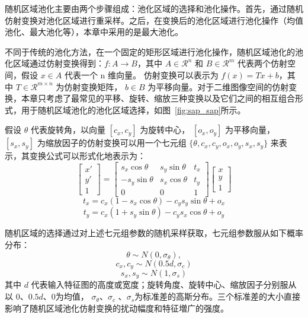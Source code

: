 随机区域池化主要由两个步骤组成：池化区域的选择和池化操作。首先，通过随机仿射变换对池化区域进行重采样。之后，在变换后的池化区域进行池化操作（均值池化、最大池化等），本章中采用的是最大池化。

不同于传统的池化方法，在一个固定的矩形区域进行池化操作，随机区域池化的池化区域通过仿射变换得到：$f : A {\rightarrow} B$，其中 $A {\in} \mathcal{R}^n$ 和 $B {\in} \mathcal{R}^m$ 代表两个仿射空间，假设 $x {\in} A$  代表一个 n 维向量。 仿射变换可以表示为 $f(x) = Tx + b$，其中 $T {\in} \mathcal{R}^{m \times n}$ 为仿射变换矩阵， $b {\in} B$ 为平移向量。对于二维图像空间的仿射变换，本章只考虑了最常见的平移、旋转、缩放三种变换以及它们之间的相互组合形式，用于随机区域池化的池化区域选择，如图~\ref{fig:sap_sap}所示。

假设 $\theta$ 代表旋转角，以向量 $[c_x, c_y]$ 为旋转中心， $[o_x, o_y]$ 为平移向量，$[s_x, s_y]$ 为缩放因子的仿射变换可以用一个七元组 $\{\theta, c_x, c_y, o_x, o_y, s_x, s_y\}$ 来表示，其变换公式可以形式化地表示为：
\begin{equation}  \label{equ:all}
  \left[
  \begin{array}{c}
          x' \\
          y' \\
          1
 \end{array}
 \right]
 =
  \left[
  \begin{array}{ccc}
          s_x \cos{\theta} & s_y \sin{\theta} & t_x\\
          -s_y \sin{\theta} & s_x \cos{\theta} & t_y\\
          0 & 0 & 1
  \end{array}
  \right]
  \left[
  \begin{array}{c}
          x \\
          y \\
          1
  \end{array}
  \right]
\end{equation}
\begin{equation} \label{equ:tx}
t_x = c_x (1 - s_x \cos{\theta}) - c_y s_y \sin{\theta} + o_x
\end{equation}
\begin{equation} \label{equ:ty}
t_y = c_x (1 + s_y \sin{\theta}) - c_y s_x \cos{\theta} + o_y
\end{equation}

随机区域的选择通过对上述七元组参数的随机采样获取，七元组参数服从如下概率分布：
\begin{equation} \label{equ:theta}
\theta \sim N(0, \sigma_{\theta}), 
\end{equation}
\begin{equation} \label{equ:cx}
c_x, c_y \sim N(0.5d, \sigma_{c})
\end{equation}
\begin{equation} \label{equ:sx}
s_x, s_y \sim N(1, \sigma_{s})
\end{equation}
其中 $d$ 代表输入特征图的高度或宽度；旋转角度、旋转中心、缩放因子分别服从以 0、$0.5d$、0为均值，
$\sigma_{\theta}$、$\sigma_c$ 、$\sigma_s$为标准差的高斯分布。三个标准差的大小直接影响了随机区域池化仿射变换的扰动幅度和特征増广的强度。


